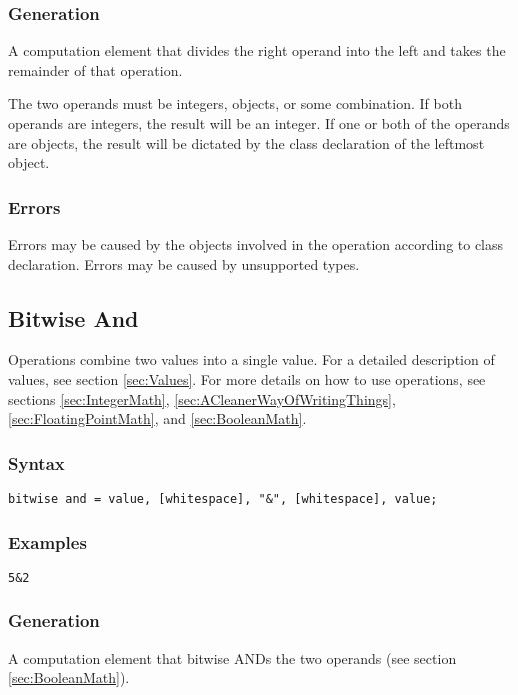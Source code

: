 \documentclass[10pt,a4paper]{article}
\begin{document}
\subsubsection{Generation}
A computation element that divides the right operand into the left and takes the remainder of that operation.

The two operands must be integers, objects, or some combination. If both operands are integers, the result will be an integer. If one or both of the operands are objects, the result will be dictated by the class declaration of the leftmost object.

\subsubsection{Errors}
Errors may be caused by the objects involved in the operation according to class declaration. Errors may be caused by unsupported types.

\newpage




\subsection{Bitwise And}
Operations combine two values into a single value. For a detailed description of values, see section \ref{sec:Values}. For more details on how to use operations, see sections \ref{sec:IntegerMath}, \ref{sec:ACleanerWayOfWritingThings}, \ref{sec:FloatingPointMath}, and \ref{sec:BooleanMath}.

\subsubsection{Syntax}
\begin{verbatim}
bitwise and = value, [whitespace], "&", [whitespace], value;
\end{verbatim}

\subsubsection{Examples}
\begin{verbatim}
5&2
\end{verbatim}

\subsubsection{Generation}
A computation element that bitwise ANDs the two operands (see section \ref{sec:BooleanMath}).
\end{document}
